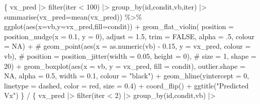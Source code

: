 \documentclass[
  letterpaper,
  DIV=11,
  numbers=noendperiod]{scrartcl}
\newenvironment{Shaded}{\begin{snugshade}}{\end{snugshade}}
\newcommand{\AttributeTok}[1]{\textcolor[rgb]{0.40,0.45,0.13}{#1}}
\newcommand{\CommentTok}[1]{\textcolor[rgb]{0.37,0.37,0.37}{#1}}
\newcommand{\ConstantTok}[1]{\textcolor[rgb]{0.56,0.35,0.01}{#1}}
\newcommand{\DecValTok}[1]{\textcolor[rgb]{0.68,0.00,0.00}{#1}}
\newcommand{\FloatTok}[1]{\textcolor[rgb]{0.68,0.00,0.00}{#1}}
\newcommand{\FunctionTok}[1]{\textcolor[rgb]{0.28,0.35,0.67}{#1}}
\newcommand{\NormalTok}[1]{\textcolor[rgb]{0.00,0.23,0.31}{#1}}
\newcommand{\SpecialCharTok}[1]{\textcolor[rgb]{0.37,0.37,0.37}{#1}}
\newcommand{\StringTok}[1]{\textcolor[rgb]{0.13,0.47,0.30}{#1}}
\begin{document}
\begin{Shaded}
\begin{Highlighting}[]
\NormalTok{\{}
\NormalTok{vx\_pred  }\SpecialCharTok{|\textgreater{}}
  \FunctionTok{filter}\NormalTok{(iter }\SpecialCharTok{\textless{}} \DecValTok{100}\NormalTok{)  }\SpecialCharTok{|\textgreater{}} \FunctionTok{group\_by}\NormalTok{(id,condit,vb,iter) }\SpecialCharTok{|\textgreater{}}
  \FunctionTok{summarise}\NormalTok{(}\AttributeTok{vx\_pred=}\FunctionTok{mean}\NormalTok{(vx\_pred)) }\SpecialCharTok{\%\textgreater{}\%}
  \FunctionTok{ggplot}\NormalTok{(}\FunctionTok{aes}\NormalTok{(}\AttributeTok{x=}\NormalTok{vb,}\AttributeTok{y=}\NormalTok{vx\_pred,}\AttributeTok{fill=}\NormalTok{condit)) }\SpecialCharTok{+} 
  \FunctionTok{geom\_flat\_violin}\NormalTok{( }\AttributeTok{position =} \FunctionTok{position\_nudge}\NormalTok{(}\AttributeTok{x =} \FloatTok{0.1}\NormalTok{, }\AttributeTok{y =} \DecValTok{0}\NormalTok{),}
                   \AttributeTok{adjust =} \FloatTok{1.5}\NormalTok{,}
                   \AttributeTok{trim =} \ConstantTok{FALSE}\NormalTok{, }\AttributeTok{alpha =}\NormalTok{ .}\DecValTok{5}\NormalTok{, }\AttributeTok{colour =} \ConstantTok{NA}\NormalTok{) }\SpecialCharTok{+}
  \CommentTok{\# geom\_point(aes(x = as.numeric(vb) {-} 0.15, y = vx\_pred, colour = vb),}
  \CommentTok{\#            position = position\_jitter(width = 0.05, height = 0),}
  \CommentTok{\#            size = 1, shape = 20) +}
  \FunctionTok{geom\_boxplot}\NormalTok{(}\FunctionTok{aes}\NormalTok{(}\AttributeTok{x =}\NormalTok{ vb, }\AttributeTok{y =}\NormalTok{ vx\_pred, }\AttributeTok{fill =}\NormalTok{ condit),}
               \AttributeTok{outlier.shape =} \ConstantTok{NA}\NormalTok{,}
               \AttributeTok{alpha =} \FloatTok{0.5}\NormalTok{,}
               \AttributeTok{width =} \FloatTok{0.1}\NormalTok{,}
               \AttributeTok{colour =} \StringTok{"black"}\NormalTok{) }\SpecialCharTok{+}
  \FunctionTok{geom\_hline}\NormalTok{(}\AttributeTok{yintercept =} \DecValTok{0}\NormalTok{,}
             \AttributeTok{linetype =} \StringTok{\textquotesingle{}dashed\textquotesingle{}}\NormalTok{,}
             \AttributeTok{color =} \StringTok{\textquotesingle{}red\textquotesingle{}}\NormalTok{,}
             \AttributeTok{size =} \FloatTok{0.4}\NormalTok{) }\SpecialCharTok{+} 
  \FunctionTok{coord\_flip}\NormalTok{() }\SpecialCharTok{+} \FunctionTok{ggtitle}\NormalTok{(}\StringTok{"Predicted Vx"}\NormalTok{)  }
\NormalTok{\} }\SpecialCharTok{/}\NormalTok{ \{}
\NormalTok{vx\_pred  }\SpecialCharTok{|\textgreater{}}
  \FunctionTok{filter}\NormalTok{(iter }\SpecialCharTok{\textless{}} \DecValTok{2}\NormalTok{)  }\SpecialCharTok{|\textgreater{}} \FunctionTok{group\_by}\NormalTok{(id,condit,vb) }\SpecialCharTok{|\textgreater{}}

\end{Highlighting}
\end{Shaded}
\end{document}
